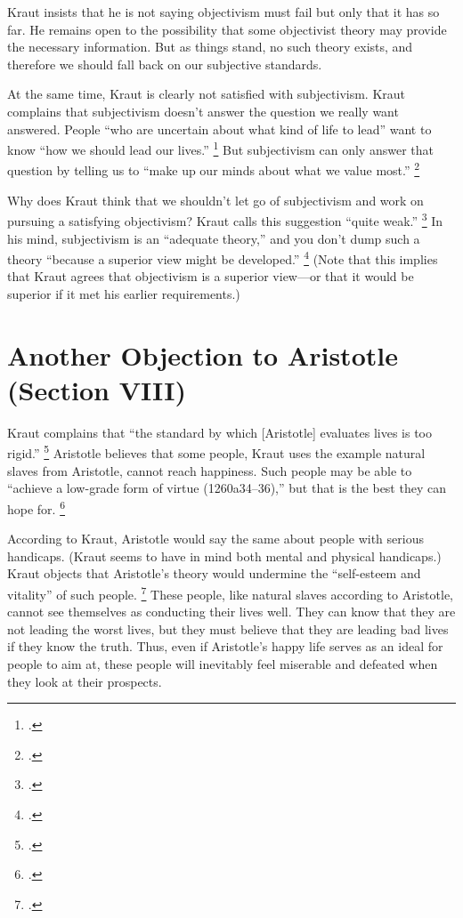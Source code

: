 \documentclass[12pt,letterpaper]{article}
\begin{document}
Kraut insists that he is not saying objectivism must fail but only that it has so far.
He remains open to the possibility that some objectivist theory may provide the necessary information.
But as things stand, no such theory exists, and therefore we should fall back on our subjective standards.

At the same time, Kraut is clearly not satisfied with subjectivism.
Kraut complains that subjectivism doesn't answer the question we really want answered.
People ``who are uncertain about what kind of life to lead'' want to know ``how we should lead our lives.''%
\footcite[][190]{two-conceptions-of-happiness-kraut-1979}
But subjectivism can only answer that question by telling us to ``make up our minds about what we value most.''%
\footcite[][190]{two-conceptions-of-happiness-kraut-1979}

Why does Kraut think that we shouldn't let go of subjectivism and work on pursuing a satisfying objectivism?
Kraut calls this suggestion ``quite weak.''%
\footcite[][190, note 35]{two-conceptions-of-happiness-kraut-1979}
In his mind, subjectivism is an ``adequate theory,'' and you don't dump such a theory ``because a superior view might be developed.''
\footcite[][190, note 35]{two-conceptions-of-happiness-kraut-1979}
(Note that this implies that Kraut agrees that objectivism is a superior view---or that it would be superior if it met his earlier requirements.)

\section*{Another Objection to Aristotle (Section VIII)}

Kraut complains that ``the standard by which [Aristotle] evaluates lives is too rigid.''%
\footcite[][192]{two-conceptions-of-happiness-kraut-1979}
Aristotle believes that some people, Kraut uses the example natural slaves from Aristotle, cannot reach happiness.
Such people may be able to ``achieve a low-grade form of virtue (1260a34--36),'' but that is the best they can hope for.%
\footcite[][193]{two-conceptions-of-happiness-kraut-1979}

According to Kraut, Aristotle would say the same about people with serious handicaps.
(Kraut seems to have in mind both mental and physical handicaps.)
Kraut objects that Aristotle's theory would undermine the ``self-esteem and vitality'' of such people.%
\footcite[][193]{two-conceptions-of-happiness-kraut-1979}
These people, like natural slaves according to Aristotle, cannot see themselves as conducting their lives well.
They can know that they are not leading the worst lives, but they must believe that they are leading bad lives if they know the truth.
Thus, even if Aristotle's happy life serves as an ideal for people to aim at, these people will inevitably feel miserable and defeated when they look at their prospects.
\end{document}
